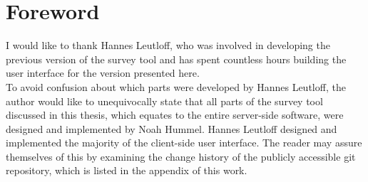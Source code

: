 \documentclass[a4paper,11pt]{article}
\begin{document}
    
    \maketitle

    \pagebreak

    

    \pagebreak

    

    \pagebreak
    
    \tableofcontents

    \pagebreak
    
    \section{Foreword}
        I would like to thank Hannes Leutloff, who was involved in developing
        the previous version of the survey tool and has spent countless hours
        building the user interface for the version presented here. \\

        To avoid confusion about which parts were developed by Hannes Leutloff,
        the author would like to unequivocally state that all parts of the
        survey tool discussed in this thesis, which equates to the entire
        server-side software, were designed and implemented by Noah Hummel.
        Hannes Leutloff designed and implemented the majority of the client-side
        user interface. The reader may assure themselves of this by
        examining the change history of the publicly accessible git repository,
        which is listed in the appendix of this work.

    
    
    
    
    
    
    

    \pagebreak
    
    \listoffigures
    \listoftables
    
    
    
    
\end{document}
